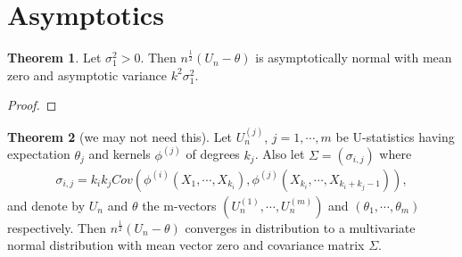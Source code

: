 \documentclass{article}
\theoremstyle{definition}
\newtheorem{theorem}{Theorem}
\numberwithin{Def}{section}
\begin{document}
    
    
    \section{Asymptotics} 
    \begin{theorem}
    Let $\sigma_1^{2} > 0$. Then $n^{\frac{1}{2}}(U_n - \theta)$ is asymptotically normal with mean zero and asymptotic variance $k^2 \sigma_1^2$.
    \end{theorem}
    
    \begin{proof}
    
    \end{proof}
    
    \begin{theorem}[we may not need this]
    Let $U_n^{(j)}$, $j = 1, \cdots, m$ be U-statistics having expectation $\theta_j$ and kernels $\phi^{(j)}$ of degrees $k_j$. Also let $\Sigma = (\sigma_{i,j})$ where 
    \begin{align*}
        \sigma_{i,j} = k_i k_j Cov(\phi^{(i)} (X_1, \cdots, X_{k_i}), \phi^{(j)} (X_{k_i}, \cdots, X_{k_i + k_j -1})),
    \end{align*}
    and denote by $U_n$ and $\theta$ the m-vectors $(U_n^{(1)}, \cdots, U_n^{(m)})$ and $(\theta_1, \cdots, \theta_m)$ respectively. Then $n^{\frac{1}{2}}(U_n - \theta)$ converges in distribution to a multivariate normal distribution with mean vector zero and covariance matrix $\Sigma$.
    \end{theorem}
    
\end{document}
